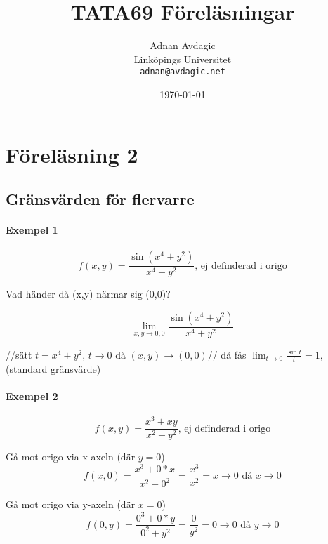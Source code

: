 \documentclass{article}
\begin{document}
\title{TATA69 Föreläsningar}
\author{Adnan Avdagic\\
	Linköpings Universitet\\
	\texttt{adnan@avdagic.net}}
\date{\today}
\maketitle

\newpage

\tableofcontents

\newpage
\noindent

\section{Föreläsning 2}
\subsection{Gränsvärden för flervarre}

\paragraph{Exempel 1} \flushleft
\begin{equation} \label{eq:1}
	f(x,y) = \frac{\sin(x^4+y^2)}{x^4+y^2} \text{, ej definderad i origo}
\end{equation}

Vad händer då (x,y) närmar sig (0,0)?

$$\lim_{x,y \rightarrow 0,0} \frac{\sin(x^4+y^2)}{x^4+y^2}$$

//sätt $t= \displaystyle x^4+y^2$, ${t \rightarrow 0}$ då ${(x,y) \rightarrow (0,0)}$// \newline
då fås \(\displaystyle \lim_{t \rightarrow 0} \frac{\sin t}{t} = 1,\) (standard gränsvärde) \newline

\paragraph{Exempel 2} \flushleft
\begin{equation} \label{eq:2}
	f(x,y) = \frac{x^3+xy}{x^2+y^2} \text{, ej definderad i origo}
\end{equation}

Gå mot origo via x-axeln (där $y=0$)
\[f(x,0) = \frac{x^3+0*x}{x^2+0^2} = \frac{x^3}{x^2} =  {x \rightarrow 0} \text{ då } {x \rightarrow 0}\]

Gå mot origo via y-axeln (där $x=0$)
\[f(0,y) = \frac{0^3+0*y}{0^2+y^2} = \frac{0}{y^2} =  {0 \rightarrow 0} \text{ då } {y \rightarrow 0}\]
\end{document}
